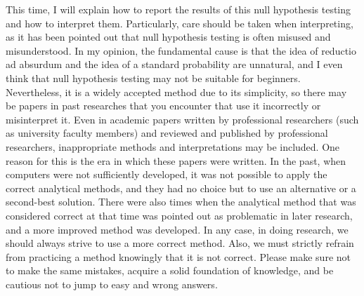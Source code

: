 \documentclass{ltjsbook}
\begin{document}
This time, I will explain how to report the results of this null hypothesis testing and how to interpret them. Particularly, care should be taken when interpreting, as it has been pointed out that null hypothesis testing is often misused and misunderstood. In my opinion, the fundamental cause is that the idea of reductio ad absurdum and the idea of a standard probability are unnatural, and I even think that null hypothesis testing may not be suitable for beginners. Nevertheless, it is a widely accepted method due to its simplicity, so there may be papers in past researches that you encounter that use it incorrectly or misinterpret it. Even in academic papers written by professional researchers (such as university faculty members) and reviewed and published by professional researchers, inappropriate methods and interpretations may be included. One reason for this is the era in which these papers were written. In the past, when computers were not sufficiently developed, it was not possible to apply the correct analytical methods, and they had no choice but to use an alternative or a second-best solution. There were also times when the analytical method that was considered correct at that time was pointed out as problematic in later research, and a more improved method was developed. In any case, in doing research, we should always strive to use a more correct method. Also, we must strictly refrain from practicing a method knowingly that it is not correct. Please make sure not to make the same mistakes, acquire a solid foundation of knowledge, and be cautious not to jump to easy and wrong answers.
\end{document}
